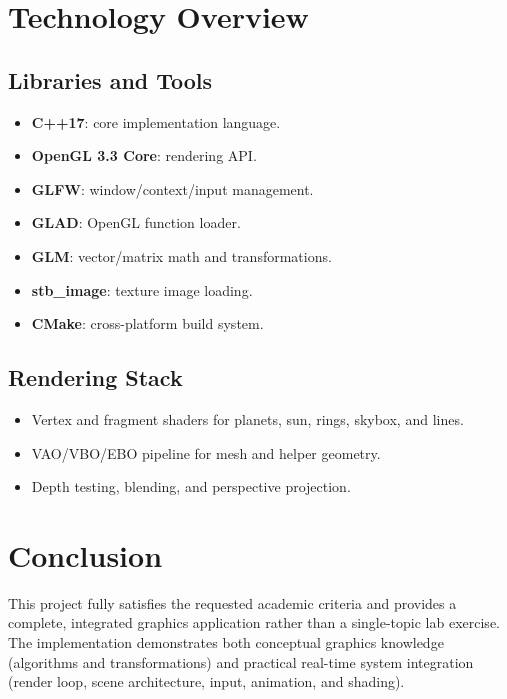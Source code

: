 \documentclass[11pt,a4paper]{article}
\begin{document}
\section{Technology Overview}

\subsection{Libraries and Tools}
\begin{itemize}[leftmargin=*]
    \item \textbf{C++17}: core implementation language.
    \item \textbf{OpenGL 3.3 Core}: rendering API.
    \item \textbf{GLFW}: window/context/input management.
    \item \textbf{GLAD}: OpenGL function loader.
    \item \textbf{GLM}: vector/matrix math and transformations.
    \item \textbf{stb\_image}: texture image loading.
    \item \textbf{CMake}: cross-platform build system.
\end{itemize}

\subsection{Rendering Stack}
\begin{itemize}[leftmargin=*]
    \item Vertex and fragment shaders for planets, sun, rings, skybox, and lines.
    \item VAO/VBO/EBO pipeline for mesh and helper geometry.
    \item Depth testing, blending, and perspective projection.
\end{itemize}

\section{Conclusion}

This project fully satisfies the requested academic criteria and provides a complete, integrated graphics application rather than a single-topic lab exercise. The implementation demonstrates both conceptual graphics knowledge (algorithms and transformations) and practical real-time system integration (render loop, scene architecture, input, animation, and shading).
\end{document}
